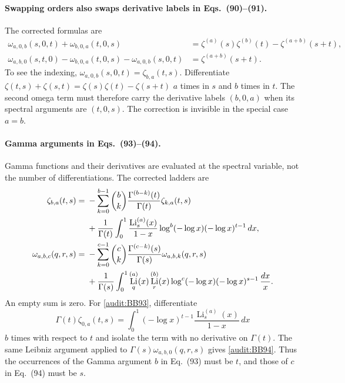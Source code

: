 \documentclass[11pt,a4paper]{article}
\theoremstyle{definition}
\theoremstyle{remark}
\DeclareMathOperator{\Li}{Li}
\numberwithin{equation}{section}
\begin{document}
\paragraph{Swapping orders also swaps derivative labels in Eqs.~(90)--(91).}
The corrected formulas are
\begin{align}
 \omega_{a,0,b}(s,0,t)+\omega_{b,0,a}(t,0,s)
 &=\zeta^{(a)}(s)\zeta^{(b)}(t)
        -\zeta^{(a+b)}(s+t),\label{audit:BB90}\\
 \omega_{a,b,0}(s,t,0)-\omega_{b,0,a}(t,0,s)
        -\omega_{a,0,b}(s,0,t)
 &=\zeta^{(a+b)}(s+t).\label{audit:BB91}
\end{align}
To see the indexing, $\omega_{a,0,b}(s,0,t)=\zeta_{b,a}(t,s)$.
Differentiate
$\zeta(t,s)+\zeta(s,t)=\zeta(s)\zeta(t)-\zeta(s+t)$
$a$ times in $s$ and $b$ times in $t$. The second omega term must
therefore carry the derivative labels $(b,0,a)$ when its spectral
arguments are $(t,0,s)$. The correction is invisible in the special
case $a=b$.

\paragraph{Gamma arguments in Eqs.~(93)--(94).}
Gamma functions and their derivatives are evaluated at the spectral
variable, not the number of differentiations. The corrected ladders are
\begin{align}
 \zeta_{b,a}(t,s)
 ={}&-\sum_{k=0}^{b-1}\binom bk
       \frac{\Gamma^{(b-k)}(t)}{\Gamma(t)}\zeta_{k,a}(t,s)\notag\\
 &+\frac1{\Gamma(t)}\int_0^1
   \frac{\Li_s^{(a)}(x)}{1-x}
   \log^b(-\log x)(-\log x)^{t-1}\,dx,
 \label{audit:BB93}\\
 \omega_{a,b,c}(q,r,s)
 ={}&-\sum_{k=0}^{c-1}\binom ck
       \frac{\Gamma^{(c-k)}(s)}{\Gamma(s)}\omega_{a,b,k}(q,r,s)\notag\\
 &+\frac1{\Gamma(s)}\int_0^1
   \Li_q^{(a)}(x)\Li_r^{(b)}(x)
   \log^c(-\log x)(-\log x)^{s-1}\,\frac{dx}{x}.
 \label{audit:BB94}
\end{align}
An empty sum is zero. For \eqref{audit:BB93}, differentiate
\[
 \Gamma(t)\zeta_{0,a}(t,s)
 =\int_0^1(-\log x)^{t-1}\frac{\Li_s^{(a)}(x)}{1-x}\,dx
\]
$b$ times with respect to $t$ and isolate the term with no derivative
on $\Gamma(t)$. The same Leibniz argument applied to
$\Gamma(s)\omega_{a,b,0}(q,r,s)$ gives \eqref{audit:BB94}.
Thus the occurrences of the Gamma argument $b$ in Eq.~(93) must be
$t$, and those of $c$ in Eq.~(94) must be $s$.
\end{document}
